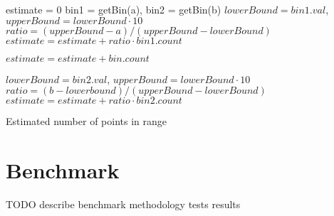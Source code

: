 \documentclass[12pt]{article}
\begin{document}
	\begin{algorithm}
		\label{estimateOSH}

		estimate = 0\;
		bin1 = getBin(a), bin2 = getBin(b)\;
		$lowerBound = bin1.val$, $upperBound = lowerBound \cdot 10$\;
		$ratio = (upperBound - a) / (upperBound - lowerBound)$\;
		$estimate = estimate + ratio \cdot bin1.count$\;

		 {
			$estimate = estimate + bin.count$
		}

		$lowerBound = bin2.val$, $upperBound = lowerBound \cdot 10$\;
		$ratio = (b - lowerbound) / (upperBound - lowerBound)$\;
		$estimate = estimate + ratio \cdot bin2.count$\;

		\caption{Estimated number of points in range}
	\end{algorithm}

	\section{Benchmark}
	TODO describe benchmark methodology
	tests
	results

	\newpage
	
	
\end{document}
